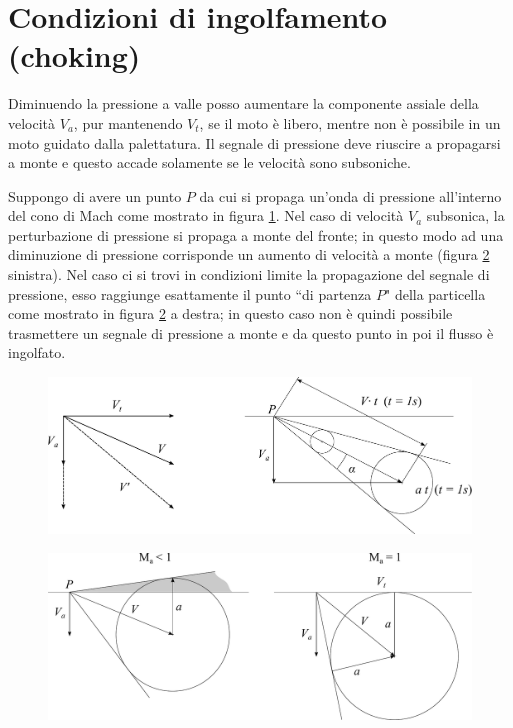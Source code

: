 \section{Condizioni di ingolfamento (choking)}
Diminuendo la pressione a valle posso aumentare la componente assiale della velocità $V_a$, pur mantenendo $V_t$, se il moto è libero, mentre non è possibile in un moto guidato dalla palettatura. Il segnale di pressione deve riuscire a propagarsi a monte e questo accade solamente se le velocità sono subsoniche. 

Suppongo di avere un punto $P$ da cui si propaga un'onda di pressione all'interno del cono di Mach come mostrato in figura \ref{fd:bloccson1}. Nel caso di velocità $V_a$ subsonica, la perturbazione di pressione si propaga a monte del fronte; in questo modo ad una diminuzione di pressione corrisponde un aumento di velocità a monte (figura \ref{fd:bloccson2} sinistra). Nel caso ci si trovi in condizioni limite la propagazione del segnale di pressione, esso raggiunge esattamente il punto ``di partenza $P$" della particella come mostrato in figura \ref{fd:bloccson2} a destra; in questo caso non è quindi possibile trasmettere un segnale di pressione a monte e da questo punto in poi il flusso è ingolfato. 
\begin{figure}
\centering
  \includegraphics[width=.8\textwidth]{fig/bloccson1.pdf}
\caption{}
\label{fd:bloccson1}
\end{figure}
\begin{figure}
\centering
  \includegraphics[width=.8\textwidth]{fig/bloccson2.pdf}
\caption{}
\label{fd:bloccson2}
\end{figure}
